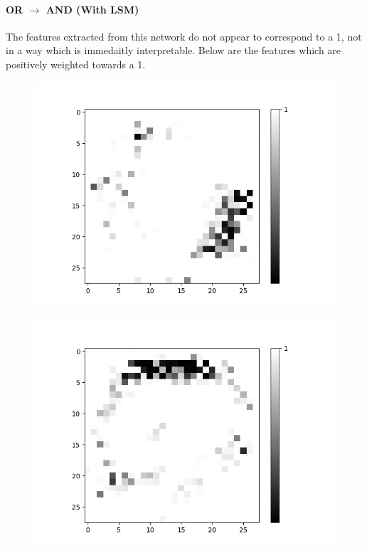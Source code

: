 \paragraph{OR $\rightarrow$ AND (With LSM)}
The features extracted from this network do not appear to correspond to a 1, not in a way which is immedaitly interpretable. Below are the features which are positively weighted towards a 1.
\begin{figure}[H]
	\captionsetup{labelformat=empty}
	\centering
	\begin{minipage}[b]{0.19\textwidth}
		\includegraphics[width=\textwidth]{OR-AND(W-LSM)(1)/Like/True/Layer0-Neuron-18.png}
		\label{}
	\end{minipage}
	\begin{minipage}[b]{0.19\textwidth}
		\includegraphics[width=\textwidth]{OR-AND(W-LSM)(1)/Like/True/Layer0-Neuron-19.png}
		\label{}
	\end{minipage}
	

\end{figure}
